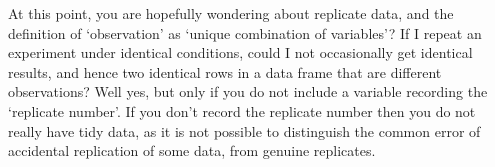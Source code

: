 \documentclass[10pt] {article}
\theoremstyle{definition}
\begin{document}
At this point, you are hopefully wondering about replicate data, and the definition of `observation' as `unique combination of variables'? If I repeat an experiment under identical conditions, could I not occasionally get identical results, and hence two identical rows in a data frame that are different observations? Well yes, but only if you do not include a variable recording the `replicate number'. If you don't record the replicate number then you do not really have tidy data, as it is not possible to distinguish the common error of accidental replication of some data, from genuine replicates.
\end{document}
